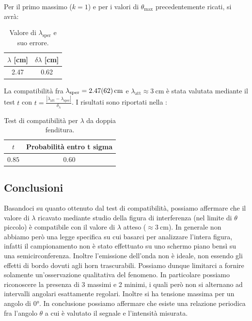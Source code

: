 \documentclass[a4paper]{article}
\begin{document}
Per il primo massimo ($k=1$) e per i valori di $\theta_{\text{max}}$ precedentemente ricati, si avrà:
\begin{table}[H]
\centering
\caption{Valore di $\lambda_{\text{sper}}$ e suo errore.}
\label{tab:valori_di_lambda}
\begin{tabular}{|c|c|}
\hline
$\lambda$ [\si{\centi\metre}] & $\delta\lambda$ [\si{\centi\metre}] \\
\hline
\num{2.47} & \num{0.62} \\
\hline
\end{tabular}
\end{table}
La compatibilità fra $\lambda_{\text{sper}} = \SI{2.47 \pm 0.62}{\centi\metre}$ e $\lambda_{\text{att}} \approx \SI{3}{\centi\metre}$ è stata valutata mediante il test $t$ con $t=\frac{|\lambda_{\text{att}}-\lambda_{\text{sper}}|}{\delta_{\lambda}}$. I risultati sono riportati nella :
\begin{table}[H]
\centering
\caption{Test di compatibilità per $\lambda$ da doppia fenditura.}
\label{tab:test_compatibilita_doppia_fenditura}
\begin{tabular}{|c|c|}
\hline
$t$ & Probabilità entro t sigma \\
\hline
$0.85$ & $0.60$ \\
\hline
\end{tabular}
\end{table}


\subsection{Conclusioni}
Basandoci su quanto ottenuto dal test di compatibilità, possiamo affermare che il valore di $\lambda$ ricavato mediante studio della figura di interferenza (nel limite di $\theta$ piccolo) è compatibile con il valore di $\lambda$ atteso ($\approx \SI{3}{\centi\metre}$). In generale non abbiamo però una legge specifica su cui basarci per analizzare l'intera figura, infatti il campionamento non è stato effettuato su uno schermo piano bensì su una semicirconferenza. Inoltre l'emissione dell'onda non è ideale, non essendo gli effetti di bordo dovuti agli horn trascurabili. Possiamo dunque limitarci a fornire solamente un'osservazione qualitativa del fenomeno. In particolare possiamo riconoscere la presenza di 3 massimi e 2 minimi, i quali però non si alternano ad intervalli angolari esattamente regolari. Inoltre si ha tensione massima per un angolo di $\ang{0}$. In conclusione possiamo affermare che esiste una relazione periodica fra l'angolo $\theta$ a cui è valutato il segnale e l'intensità misurata.
\end{document}
